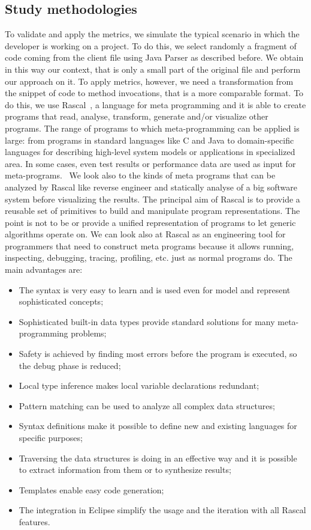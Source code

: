 \subsection{Study methodologies}
To validate and apply the metrics, we simulate the typical scenario in which the developer is working on a project. To do this, we select randomly a fragment of code coming from the client file using Java Parser as described before. We obtain in this way our context, that is only a small part of the original file and perform our approach on it. To apply metrics, however, we need a transformation from the snippet of code to method invocations, that is a more comparable format. To do this, we use Rascal~\cite{utor.rascal-mpl.org/_last_nodate}, a language for meta programming and it is able to create programs that read, analyse, transform, generate and/or visualize other programs. The range of programs to which meta-programming can be applied is large: from programs in standard languages like C and Java to domain-specific languages for describing high-level system models or applications in specialized area. In some cases, even test results or performance data are used as input for meta-programs. \
We look also to the kinds of meta programs that can be analyzed by Rascal like reverse engineer and statically analyse of a big software system before visualizing the results. The principal aim of Rascal is to provide a reusable set of primitives to build and manipulate program representations. The point is not to be or provide a unified representation of programs to let generic algorithms operate on.  
We can look also at Rascal as an engineering tool for programmers that need to construct meta programs because it allows running, inspecting, debugging, tracing, profiling, etc. just as normal programs do. The main advantages are:
\begin{itemize}
\item The syntax is very easy to learn and is used even for model and represent sophisticated concepts;
\item Sophisticated built-in data types provide standard solutions for many meta-programming problems;
\item Safety is achieved by finding most errors before the program is executed, so the debug phase is reduced;
\item Local type inference makes local variable declarations redundant;
\item Pattern matching can be used to analyze all complex data structures;
\item Syntax definitions make it possible to define new and existing languages for specific purposes;
\item Traversing the data structures is doing in an effective way and it is possible to extract information from them or to synthesize results;
\item Templates enable easy code generation;
\item The integration in Eclipse simplify the usage and the iteration with all Rascal features.
\end{itemize}
